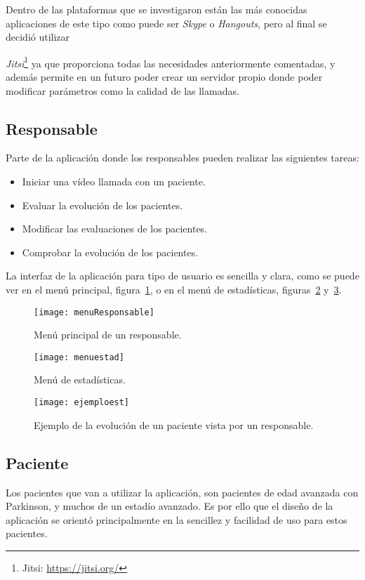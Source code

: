 Dentro de las plataformas que se investigaron están las más conocidas aplicaciones de este tipo como puede ser \textit{Skype} o \textit{Hangouts}, pero al final se decidió utilizar {\textit{Jitsi}\footnote{Jitsi: \url{https://jitsi.org/}} ya que proporciona todas las necesidades anteriormente comentadas, y además permite en un futuro poder crear un servidor propio donde poder modificar parámetros como la calidad de las llamadas.

\subsection{Responsable}
Parte de la aplicación donde los responsables pueden realizar las siguientes tareas:
\begin{itemize}
	\item Iniciar una vídeo llamada con un paciente.
	\item Evaluar la evolución de los pacientes.
	\item Modificar las evaluaciones de los pacientes.
	\item Comprobar la evolución de los pacientes.
\end{itemize}

La interfaz de la aplicación para tipo de usuario es sencilla y clara, como se puede ver en el menú principal, figura~\ref{fig:menuPaciente}, o en el menú de estadísticas, figuras~\ref{fig:menuest} y~\ref{fig:ejemploest}.

\begin{figure}[h]
	\centering
	\texttt{[image: menuResponsable]}
	\caption{Menú principal de un responsable.}
	\label{fig:menuPaciente}
\end{figure}

\begin{figure}[h]
	\centering
	\texttt{[image: menuestad]}
	\caption{Menú de estadísticas.}
	\label{fig:menuest}
\end{figure}

\begin{figure}[h]
	\centering
	\texttt{[image: ejemploest]}
	\caption{Ejemplo de la evolución de un paciente vista por un responsable.}
	\label{fig:ejemploest}
\end{figure}

\subsection{Paciente}
Los pacientes que van a utilizar la aplicación, son pacientes de edad avanzada con Parkinson, y muchos de un estadío avanzado. Es por ello que el diseño de la aplicación se orientó principalmente en la sencillez y facilidad de uso para estos pacientes.

}
